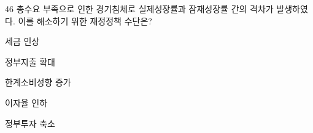 \begin{question}{46}
총수요 부족으로 인한 경기침체로 실제성장률과 잠재성장률 간의 격차가 발생하였다. 이를 해소하기 위한 재정정책 수단은?
\begin{choices}
  \item 세금 인상
  \item 정부지출 확대
  \item 한계소비성향 증가
  \item 이자율 인하
  \item 정부투자 축소
\end{choices}
\end{question}
